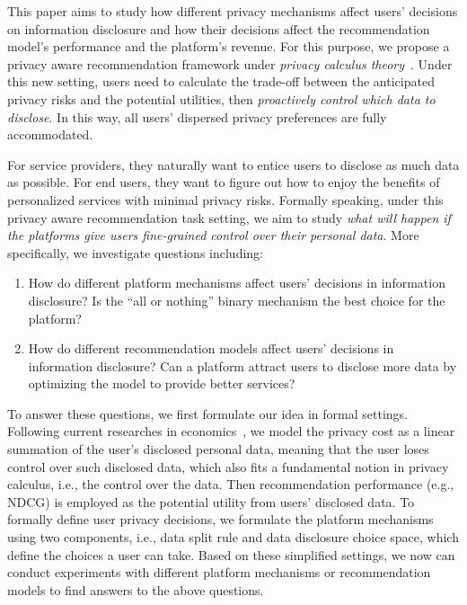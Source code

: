 This paper aims to study how different privacy mechanisms affect users' decisions on information disclosure and how their decisions affect the recommendation model's performance and the platform's revenue.
For this purpose, we propose a privacy aware recommendation framework under \textit{privacy calculus theory}~\cite{Laufer:si77:Privacy,Culnan:os99:Information}.
Under this new setting, users need to calculate the trade-off between the anticipated privacy risks and the potential utilities, then \textit{proactively control which data to disclose}. 
In this way, all users' dispersed privacy preferences are fully accommodated.


For service providers, they naturally want to entice users to disclose as much data as possible.
For end users, they want to figure out how to enjoy the benefits of personalized services with minimal privacy risks.
Formally speaking, under this privacy aware recommendation task setting, we aim to study \textit{what will happen if the platforms give users fine-grained control over their personal data}.
More specifically, we investigate questions including:
\begin {enumerate} [itemsep=5pt, topsep=6pt, label=\roman*\upshape)] %
\item How do different platform mechanisms affect users' decisions in information disclosure? Is the ``all or nothing'' binary mechanism the best choice for the platform?
\item How do different recommendation models affect users' decisions in information disclosure? Can a platform attract users to disclose more data by optimizing the model to provide better services?
\end {enumerate} 


To answer these questions, we first formulate our idea in formal settings. %
Following current researches in economics~\cite{lin2019valuing,tang2019value}, we model the privacy cost as a linear summation of the user's disclosed personal data, meaning that the user loses control over such disclosed data, which also fits a fundamental notion in privacy calculus, i.e., the control over the data. %
Then recommendation performance (e.g., NDCG) is employed as the potential utility from users' disclosed data.
To formally define user privacy decisions, we formulate the platform mechanisms using two components, i.e., data split rule and data disclosure choice space, which define the choices a user can take.
Based on these simplified settings, we now can conduct experiments with different platform mechanisms or recommendation models to find answers to the above questions.


